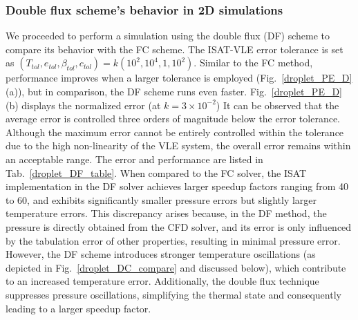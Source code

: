 \subsubsection{Double flux scheme's behavior in 2D simulations}
\label{sec:DF}
We proceeded to perform a simulation using the double flux (DF) scheme to compare its behavior with the FC scheme. The ISAT-VLE error tolerance is set as $(T_{tol},e_{tol},\beta_{tol},c_{tol})= k (10^2, 10^4, 1, 10^2)$. Similar to the FC method,  performance improves when a larger tolerance is employed (Fig.~\ref{droplet_PE_D}(a)), but in comparison, the DF scheme runs even faster. Fig.~\ref{droplet_PE_D}(b) displays the normalized error (at $k=3 \times 10^{-2}$) It can be observed that the average error is controlled three orders of magnitude below the error tolerance. Although the maximum error cannot be entirely controlled within the tolerance due to the high non-linearity of the VLE system, the overall error remains within an acceptable range. The error and performance are listed in Tab.~\ref{droplet_DF_table}. When compared to the FC solver, the ISAT implementation in the DF solver achieves larger speedup factors ranging from 40 to 60, and exhibits significantly smaller pressure errors but slightly larger temperature errors. This discrepancy arises because, in the DF method, the pressure is directly obtained from the CFD solver, and its error is only influenced by the tabulation error of other properties, resulting in minimal pressure error. However, the DF scheme introduces stronger temperature oscillations (as depicted in Fig.~\ref{droplet_DC_compare} and discussed below), which contribute to an increased temperature error. Additionally, the double flux technique suppresses pressure oscillations, simplifying the thermal state and consequently leading to a larger speedup factor.


